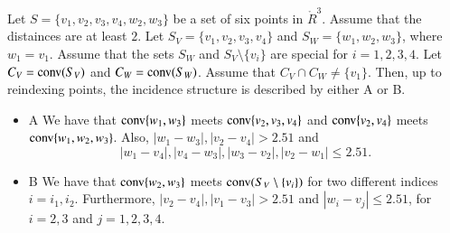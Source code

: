 \begin{lemma}
Let $S=\{v_1,v_2,v_3,v_4,w_2,w_3\}$ be a set of six points
in $\ring{R}^3$.  Assume that the distainces are at least $2$.
Let $S_V = \{v_1,v_2,v_3,v_4\}$ and $S_W=\{w_1,w_2,w_3\}$, where $w_1=v_1$.  
Assume
that the sets $S_W$ and $S_V\setminus\{v_i\}$ are special for
$i=1,2,3,4$.
Let $C_V={\operatorname{conv}}(S_V)$ and $C_W={\operatorname{conv}}(S_W)$.
Assume that $C_V\cap C_W\ne \{v_1\}$.
Then, up to reindexing points, the incidence structure 
is described by either A or B.
\begin{itemize}
\item{A} We have that ${\operatorname{conv}}\{w_1,w_3\}$ meets ${\operatorname{conv}}\{v_2,v_3,v_4\}$
and ${\operatorname{conv}}\{v_2,v_4\}$ meets ${\operatorname{conv}}\{w_1,w_2,w_3\}$.
Also, $|w_1-w_3|,|v_2-v_4|>2.51$ and 
  $$
  |w_1-v_4|,|v_4-w_3|,|w_3-v_2|,|v_2-w_1|\le 2.51.
  $$
\item{B} We have that ${\operatorname{conv}}\{w_2,w_3\}$ meets ${\operatorname{conv}}(S_V\setminus\{v_i\})$ for two different indices $i=i_1,i_2$.  Furthermore,
$|v_2-v_4|,|v_1-v_3|>2.51$ and 
$|w_i-v_j|\le 2.51$, for $i=2,3$ and $j=1,2,3,4$.
\end{itemize}
\end{lemma}

